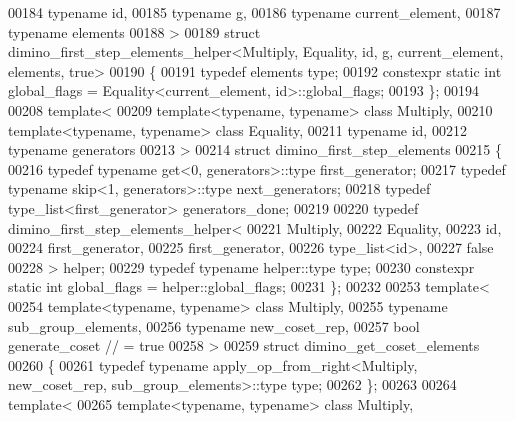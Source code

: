 \begin{DoxyCode}
00184   \textcolor{keyword}{typename} id,
00185   \textcolor{keyword}{typename} g,
00186   \textcolor{keyword}{typename} current\_element,
00187   \textcolor{keyword}{typename} elements
00188 >
00189 \textcolor{keyword}{struct }dimino\_first\_step\_elements\_helper<Multiply, Equality, id, g, current\_element, elements, true>
00190 \{
00191   \textcolor{keyword}{typedef} elements type;
00192   constexpr \textcolor{keyword}{static} \textcolor{keywordtype}{int} global\_flags = Equality<current\_element, id>::global\_flags;
00193 \};
00194 
00208 \textcolor{keyword}{template}<
00209   \textcolor{keyword}{template}<\textcolor{keyword}{typename}, \textcolor{keyword}{typename}> \textcolor{keyword}{class }Multiply,
00210   \textcolor{keyword}{template}<\textcolor{keyword}{typename}, \textcolor{keyword}{typename}> \textcolor{keyword}{class }Equality,
00211   \textcolor{keyword}{typename} id,
00212   \textcolor{keyword}{typename} generators
00213 >
00214 \textcolor{keyword}{struct }dimino\_first\_step\_elements
00215 \{
00216   \textcolor{keyword}{typedef} \textcolor{keyword}{typename} get<0, generators>::type first\_generator;
00217   \textcolor{keyword}{typedef} \textcolor{keyword}{typename} skip<1, generators>::type next\_generators;
00218   \textcolor{keyword}{typedef} type\_list<first\_generator> generators\_done;
00219 
00220   \textcolor{keyword}{typedef} dimino\_first\_step\_elements\_helper<
00221     Multiply,
00222     Equality,
00223     id,
00224     first\_generator,
00225     first\_generator,
00226     type\_list<id>,
00227     \textcolor{keyword}{false}
00228   > helper;
00229   \textcolor{keyword}{typedef} \textcolor{keyword}{typename} helper::type type;
00230   constexpr \textcolor{keyword}{static} \textcolor{keywordtype}{int} global\_flags = helper::global\_flags;
00231 \};
00232 
00253 \textcolor{keyword}{template}<
00254   \textcolor{keyword}{template}<\textcolor{keyword}{typename}, \textcolor{keyword}{typename}> \textcolor{keyword}{class }Multiply,
00255   \textcolor{keyword}{typename} sub\_group\_elements,
00256   \textcolor{keyword}{typename} new\_coset\_rep,
00257   \textcolor{keywordtype}{bool} generate\_coset      \textcolor{comment}{// = true}
00258 >
00259 \textcolor{keyword}{struct }dimino\_get\_coset\_elements
00260 \{
00261   \textcolor{keyword}{typedef} \textcolor{keyword}{typename} apply\_op\_from\_right<Multiply, new\_coset\_rep, sub\_group\_elements>::type type;
00262 \};
00263 
00264 \textcolor{keyword}{template}<
00265   \textcolor{keyword}{template}<\textcolor{keyword}{typename}, \textcolor{keyword}{typename}> \textcolor{keyword}{class }Multiply,

\end{DoxyCode}
